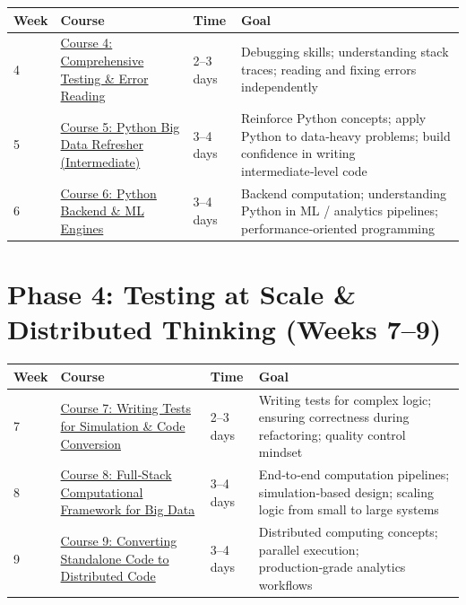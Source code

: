 \documentclass[12pt]{article}
\begin{document}
	\begin{tabularx}{\textwidth}{|X|p{3cm}|p{3cm}|X|}
		\hline
		\textbf{Week} & \textbf{Course} & \textbf{Time} & \textbf{Goal} \\
		\hline
		4 & \href{https://www.udemy.com/course/full-spectrum-comprehensive-testing-error-reading-101/}{Course 4: Comprehensive Testing \& Error Reading} & 2–3 days & Debugging skills; understanding stack traces; reading and fixing errors independently \\
		\hline
		5 & \href{https://www.udemy.com/course/refresher-python-big-data-intermediate-quiz-based-course-102/}{Course 5: Python Big Data Refresher (Intermediate)} & 3–4 days & Reinforce Python concepts; apply Python to data‑heavy problems; build confidence in writing intermediate‑level code \\
		\hline
		6 & \href{https://www.udemy.com/course/python-full-stack-and-backend-engines-for-mc-ml-engines-102/}{Course 6: Python Backend \& ML Engines} & 3–4 days & Backend computation; understanding Python in ML / analytics pipelines; performance‑oriented programming \\
		\hline
	\end{tabularx}
	
	\vspace{0.3cm}
	
	\section*{Phase 4: Testing at Scale \& Distributed Thinking (Weeks 7–9)}
	
	\begin{tabularx}{\textwidth}{|X|p{3cm}|p{3cm}|X|}
		\hline
		\textbf{Week} & \textbf{Course} & \textbf{Time} & \textbf{Goal} \\
		\hline
		7 & \href{https://www.udemy.com/course/writing-tests-for-simeng-python-code-conversion-concepts-101/}{Course 7: Writing Tests for Simulation \& Code Conversion} & 2–3 days & Writing tests for complex logic; ensuring correctness during refactoring; quality control mindset \\
		\hline
		8 & \href{https://www.udemy.com/course/full-stack-computational-framework-for-big-data-simulations/}{Course 8: Full‑Stack Computational Framework for Big Data} & 3–4 days & End‑to‑end computation pipelines; simulation‑based design; scaling logic from small to large systems \\
		\hline
		9 & \href{https://www.udemy.com/course/converting-standalone-code-to-distributed-code-for-analytics/}{Course 9: Converting Standalone Code to Distributed Code} & 3–4 days & Distributed computing concepts; parallel execution; production‑grade analytics workflows \\
		\hline
	\end{tabularx}
	
\end{document}
